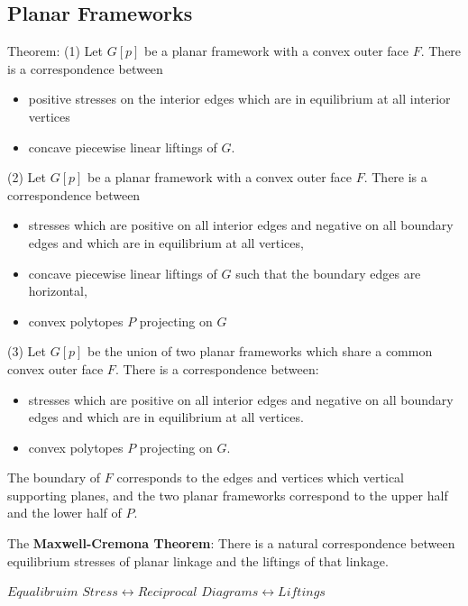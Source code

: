 \documentclass[english]{article}
\begin{document}
 \subsection{Planar Frameworks}
 Theorem: (1) Let $G[p]$ be a planar framework with a convex outer face $F$. There is a correspondence between
 \begin{itemize}
 	\item positive stresses on the interior edges which are in equilibrium at all interior vertices
	\item concave piecewise linear liftings of $G$.
 \end{itemize}
 (2) Let $G[p]$ be a planar framework with a convex outer face $F$. There is a correspondence between
 \begin{itemize}
 	\item stresses which are positive on all interior edges and negative on all boundary edges and which are in equilibrium at all vertices,
	\item concave piecewise linear liftings of $G$ such that the boundary edges are horizontal,
	\item convex polytopes $P$ projecting on $G$
 \end{itemize}
 (3) Let $G[p]$ be the union of two planar frameworks which share a common convex outer face $F$. There is a correspondence between:
 \begin{itemize}
 	\item stresses which are positive on all interior edges and negative on all boundary edges and which are in equilibrium at all vertices.
	\item convex polytopes $P$ projecting on $G$.
 \end{itemize}
 
 The boundary of $F$ corresponds to the edges and vertices which vertical supporting planes, and the two planar frameworks correspond to the upper half and the lower half of $P$.
 
 The \textbf{Maxwell-Cremona Theorem}: There is a natural correspondence between equilibrium stresses of planar linkage and the liftings of that linkage. 
 
 $Equalibruim$  $Stress \leftrightarrow Reciprocal$ $Diagrams \leftrightarrow Liftings$
 
\end{document}
